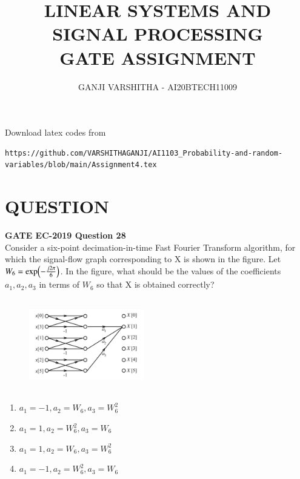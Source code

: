 \documentclass[journal,12pt,twocolumn]{IEEEtran}
\begin{document}
\let\vec\mathbf
\renewcommand{\thefigure}{\theproblem}
\def\putbox#1#2#3{\makebox[0in][l]{\makebox[#1][l]{}\raisebox{\baselineskip}[0in][0in]{\raisebox{#2}[0in][0in]{#3}}}}
     \def\rightbox#1{\makebox[0in][r]{#1}}
     \def\centbox#1{\makebox[0in]{#1}}
     \def\topbox#1{\raisebox{-\baselineskip}[0in][0in]{#1}}
     \def\midbox#1{\raisebox{-0.5\baselineskip}[0in][0in]{#1}}
\vspace{3cm}
\title{\textbf{LINEAR SYSTEMS AND SIGNAL PROCESSING \\ GATE ASSIGNMENT}}
\author{GANJI VARSHITHA - AI20BTECH11009}
\maketitle
\newpage
\bigskip
\renewcommand{\thefigure}{\arabic{figure}}
\renewcommand{\thetable}{\arabic{table}}
Download latex codes from 
%
\begin{lstlisting}
https://github.com/VARSHITHAGANJI/AI1103_Probability-and-random-variables/blob/main/Assignment4.tex
\end{lstlisting}
\section*{QUESTION}
\textbf{GATE EC-2019 Question 28}
\\
Consider a six-point decimation-in-time Fast Fourier Transform  algorithm, for which the signal-flow graph corresponding to X is shown in the figure. Let $W_{6}=\text{exp\ensuremath{\left(-\frac{j2\pi}{6}\right)}}$. In the figure, what should be the values of the coefficients $a_{1}, a_{2}, a_{3}$ in terms of $W_{6}$ so that X is obtained correctly?
\begin{figure}[h]
\includegraphics[width=5cm, height=4cm]{gateq1}
\centering
\end{figure}


\begin{enumerate}
   \item  $a_{1}=-1, a_{2}=W_{6}, a_{3}=W_{6}^{2}$ 
   \item  $a_{1}=1, a_{2}=W_{6}^{2}, a_{3}=W_{6}$ 
   \item  $a_{1}=1, a_{2}=W_{6}, a_{3}=W_{6}^{2}$ 
   \item  $a_{1}=-1, a_{2}=W_{6}^{2}, a_{3}=W_{6}$ 
   
\end{enumerate}
\end{document}
